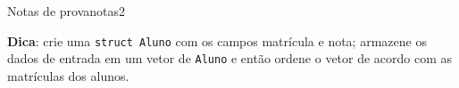 \documentclass[12pt,a4paper,oneside]{article}
\begin{document}
\begin{problem}{Notas de prova}{notas}{2}
\begin{example}
%
\end{example}


\begin{example}
%
\end{example}

\textbf{Dica}: crie uma \texttt{struct Aluno} com os campos matrícula e nota; armazene os dados de entrada em um vetor de \texttt{Aluno} e então ordene o vetor de acordo
com as matrículas dos alunos.


\end{problem}
\end{document}
